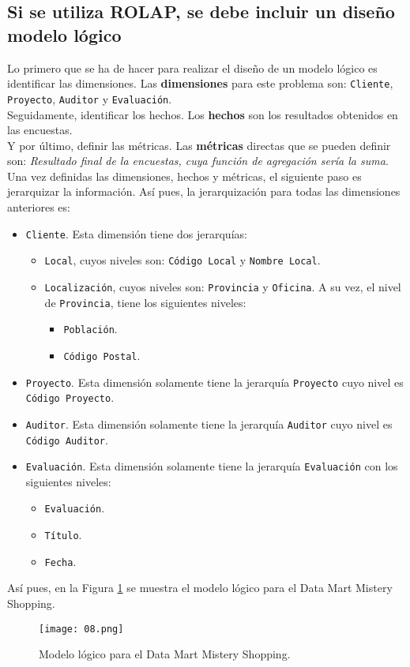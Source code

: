 \medskip
\subsection{Si se utiliza ROLAP, se debe incluir un diseño modelo lógico}
\label{08}
Lo primero que se ha de hacer para realizar el diseño de un modelo lógico es identificar las dimensiones. Las \textbf{dimensiones} para este problema son: \texttt{Cliente}, \texttt{Proyecto}, \texttt{Auditor} y \texttt{Evaluación}. \\

Seguidamente, identificar los hechos. Los \textbf{hechos} son los resultados obtenidos en las encuestas. \\

Y por último, definir las métricas. Las \textbf{métricas} directas que se pueden definir son: \textit{Resultado final de la encuestas, cuya función de agregación sería la suma}.\\

Una vez definidas las dimensiones, hechos y métricas, el siguiente paso es jerarquizar la información. Así pues, la jerarquización para todas las dimensiones anteriores es:
\begin{itemize}
 \item \texttt{Cliente}. Esta dimensión tiene dos jerarquías:
 \begin{itemize}
  \item \texttt{Local}, cuyos niveles son: \texttt{Código Local} y \texttt{Nombre Local}.
  \item \texttt{Localización}, cuyos niveles son: \texttt{Provincia} y \texttt{Oficina}. A su vez, el nivel de \texttt{Provincia}, tiene los siguientes niveles:
  \begin{itemize}
   \item \texttt{Población}.
   \item \texttt{Código Postal}.
  \end{itemize}

 \end{itemize}

 \item \texttt{Proyecto}. Esta dimensión solamente tiene la jerarquía \texttt{Proyecto} cuyo nivel es \texttt{Código Proyecto}.
 \item \texttt{Auditor}. Esta dimensión solamente tiene la jerarquía \texttt{Auditor} cuyo nivel es \texttt{Código Auditor}.
 \item \texttt{Evaluación}. Esta dimensión solamente tiene la jerarquía \texttt{Evaluación} con los siguientes niveles:
\begin{itemize}
 \item \texttt{Evaluación}.
 \item \texttt{Título}.
 \item \texttt{Fecha}.
\end{itemize}
\end{itemize}

Así pues, en la Figura \ref{08-image} se muestra el modelo lógico para el Data Mart Mistery Shopping.

\begin{figure}[!th]
\texttt{[image: 08.png]}
\centering
\caption{Modelo lógico para el Data Mart Mistery Shopping.}
\label{08-image}
\end{figure}
